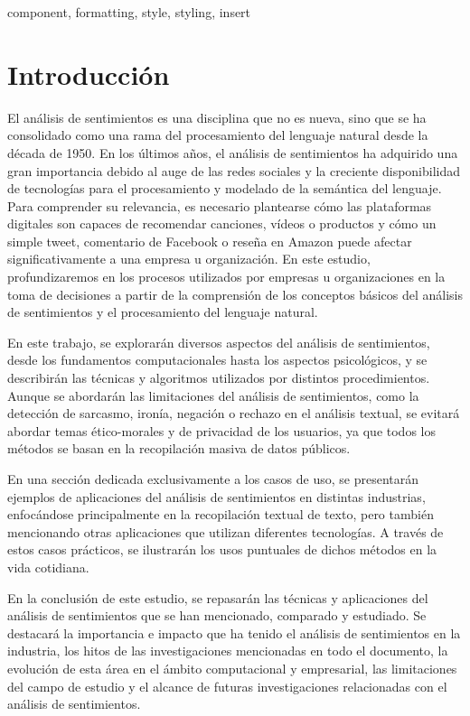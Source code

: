 \documentclass[12pt, conference]{IEEEtran}
\begin{document}
\begin{IEEEkeywords}
component, formatting, style, styling, insert
\end{IEEEkeywords}

\section{Introducción}
El análisis de sentimientos es una disciplina que no es nueva, sino que se ha consolidado como una rama del procesamiento del lenguaje natural desde la década de 1950. 
En los últimos años, el análisis de sentimientos ha adquirido una gran importancia debido al auge de las redes sociales y la creciente disponibilidad de tecnologías para el procesamiento y modelado de la semántica del lenguaje. 
Para comprender su relevancia, es necesario plantearse cómo las plataformas digitales son capaces de recomendar canciones, vídeos o productos y cómo un simple tweet, comentario de Facebook o reseña en Amazon puede afectar significativamente a una empresa u organización. 
En este estudio, profundizaremos en los procesos utilizados por empresas u organizaciones en la toma de decisiones a partir de la comprensión de los conceptos básicos del análisis de sentimientos y el procesamiento del lenguaje natural.

En este trabajo, se explorarán diversos aspectos del análisis de sentimientos, desde los fundamentos computacionales hasta los aspectos psicológicos, y se describirán las técnicas y algoritmos utilizados por distintos procedimientos. 
Aunque se abordarán las limitaciones del análisis de sentimientos, como la detección de sarcasmo, ironía, negación o rechazo en el análisis textual, se evitará abordar temas ético-morales y de privacidad de los usuarios, ya que todos los métodos se basan en la recopilación masiva de datos públicos.

En una sección dedicada exclusivamente a los casos de uso, se presentarán ejemplos de aplicaciones del análisis de sentimientos en distintas industrias, enfocándose principalmente en la recopilación textual de texto, pero también mencionando otras aplicaciones que utilizan diferentes tecnologías. 
A través de estos casos prácticos, se ilustrarán los usos puntuales de dichos métodos en la vida cotidiana.

En la conclusión de este estudio, se repasarán las técnicas y aplicaciones del análisis de sentimientos que se han mencionado, comparado y estudiado. 
Se destacará la importancia e impacto que ha tenido el análisis de sentimientos en la industria, los hitos de las investigaciones mencionadas en todo el documento, la evolución de esta área en el ámbito computacional y empresarial, las limitaciones del campo de estudio y el alcance de futuras investigaciones relacionadas con el análisis de sentimientos.
\end{document}
